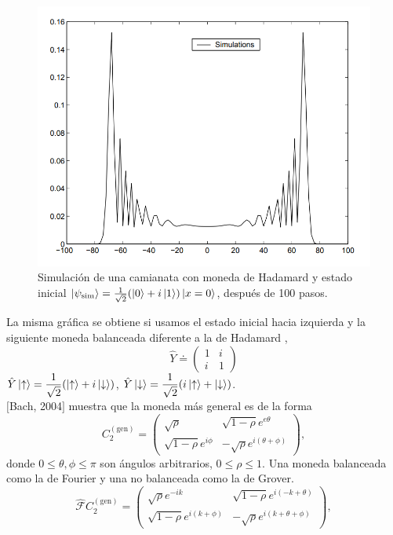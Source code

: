 \begin{figure}[ht]
\centering
\includegraphics[width=1\textwidth]{Kap3/QWonlinesymmetricNayak.png}
\caption{Simulación de una camianata con moneda de Hadamard y estado inicial $\ket{\psi_{\text{sim}}}=\frac{1}{\sqrt{2}}(\ket{0}+i\ket{1})\ket{x=0}$, después de 100 pasos.}
\label{gr:Hadamard100Symmetric}
\end{figure}

La misma gráfica se obtiene si usamos el estado inicial hacia izquierda y la siguiente moneda balanceada diferente a la de Hadamard \cite{kempe2003quantum},
\begin{equation*}
\hat{Y}\doteq
\begin{pmatrix}
1 & i\\
i & 1
\end{pmatrix}
\end{equation*}{}
$\hat{Y}\ket{\uparrow}=\dfrac{1}{\sqrt{2}}(\ket{\uparrow}+i\ket{\downarrow})$, $\hat{Y}\ket{\downarrow}=\dfrac{1}{\sqrt{2}}(i\ket{\uparrow}+\ket{\downarrow})$.\\

$[$Bach, 2004$]$ muestra que la moneda más general es de la forma
\begin{equation}
    C_2^{(\text{gen})}=
    \begin{pmatrix}
    \sqrt{\rho}&\sqrt{1-\rho}e^{e\theta}\\
    \sqrt{1-\rho}e^{i\phi} & -\sqrt{\rho}e^{i(\theta+\phi)}
    \end{pmatrix}{},
    \label{MonedaGeneral}
\end{equation}{}
donde $0\leq\theta,\phi\leq\pi$ son ángulos arbitrarios, $0\leq\rho\leq1$.
Una moneda balanceada como la de Fourier y una no balanceada como la de Grover.
\begin{equation}
    \hat{\mathcal{F}} C_2^{(\text{gen})}=
    \begin{pmatrix}
    \sqrt{\rho}e^{-ik}&\sqrt{1-\rho}e^{i(-k+\theta)}\\
    \sqrt{1-\rho}e^{i(k+\phi)} & -\sqrt{\rho}e^{i(k+\theta+\phi)}
    \end{pmatrix}{},
    \label{MonedaGeneral}
\end{equation}{}

